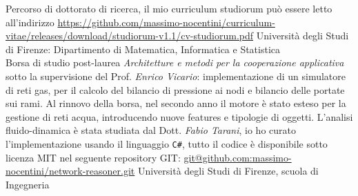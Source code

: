 \documentclass[totpages,openbib,italian]{europecv}
\begin{document}


\begin{europecv}
\ecvpersonalinfo[20pt]



{Percorso di dottorato di ricerca, il mio curriculum studiorum pu\`o essere letto all'indirizzo
\url{https://github.com/massimo-nocentini/curriculum-vitae/releases/download/studiorum-v1.1/cv-studiorum.pdf}}
{Universit\`a degli Studi di Firenze: Dipartimento di Matematica, Informatica e Statistica}
\\
{Borsa di studio post-laurea \emph{Architetture e metodi
 per la cooperazione applicativa} sotto la supervisione del
 Prof. \emph{Enrico Vicario}: implementazione di un simulatore
 di reti gas, per il calcolo del bilancio di pressione ai nodi
 e bilancio delle portate sui rami. Al rinnovo della borsa,
 nel secondo anno il motore \`e stato esteso per la gestione
 di reti acqua, introducendo nuove features e tipologie di oggetti.
 L'analisi fluido-dinamica \`e stata studiata dal Dott. \emph{Fabio Tarani}, 
 io ho curato l'implementazione usando il linguaggio \texttt{C\#},
 tutto il codice \`e disponibile sotto licenza MIT nel seguente
 repository GIT: \url{git@github.com:massimo-nocentini/network-reasoner.git} }
{Universit\`a degli Studi di Firenze, scuola di Ingegneria}



\end{europecv}
\end{document}
